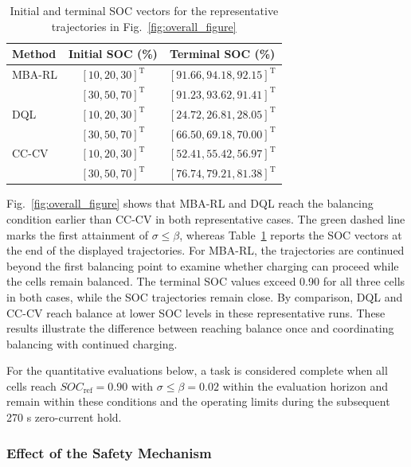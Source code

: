 \begin{table}[!t]
\centering
\caption{Initial and terminal SOC vectors for the representative trajectories in Fig.~\ref{fig:overall_figure}}
\label{tab:soc_vectors}
\scriptsize
\setlength{\tabcolsep}{2pt}
\begin{tabular}{@{}lcc@{}}
\toprule
Method & Initial SOC (\%) & Terminal SOC (\%) \\
\midrule
MBA-RL & $[10,20,30]^{\mathrm T}$ & $[91.66,94.18,92.15]^{\mathrm T}$ \\
 & $[30,50,70]^{\mathrm T}$ & $[91.23,93.62,91.41]^{\mathrm T}$ \\
DQL & $[10,20,30]^{\mathrm T}$ & $[24.72,26.81,28.05]^{\mathrm T}$ \\
 & $[30,50,70]^{\mathrm T}$ & $[66.50,69.18,70.00]^{\mathrm T}$ \\
CC-CV & $[10,20,30]^{\mathrm T}$ & $[52.41,55.42,56.97]^{\mathrm T}$ \\
 & $[30,50,70]^{\mathrm T}$ & $[76.74,79.21,81.38]^{\mathrm T}$ \\
\bottomrule
\end{tabular}
\end{table}

Fig.~\ref{fig:overall_figure} shows that MBA-RL and DQL reach the balancing condition earlier than CC-CV in both representative cases. The green dashed line marks the first attainment of $\sigma\leq\beta$, whereas Table~\ref{tab:soc_vectors} reports the SOC vectors at the end of the displayed trajectories. For MBA-RL, the trajectories are continued beyond the first balancing point to examine whether charging can proceed while the cells remain balanced. The terminal SOC values exceed 0.90 for all three cells in both cases, while the SOC trajectories remain close. By comparison, DQL and CC-CV reach balance at lower SOC levels in these representative runs. These results illustrate the difference between reaching balance once and coordinating balancing with continued charging.

For the quantitative evaluations below, a task is considered complete when all cells reach $SOC_{\mathrm{ref}}=0.90$ with $\sigma\leq\beta=0.02$ within the evaluation horizon and remain within these conditions and the operating limits during the subsequent 270 s zero-current hold.

\subsubsection{Effect of the Safety Mechanism}

